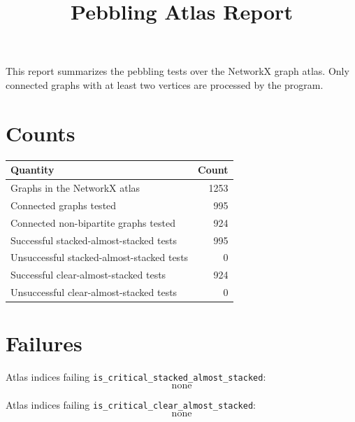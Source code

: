 \documentclass{amsart}
\title{Pebbling Atlas Report}
\author{}
\date{}
\begin{document}
\maketitle

This report summarizes the pebbling tests over the NetworkX graph atlas.
Only connected graphs with at least two vertices are processed by the program.

\section*{Counts}

\begin{center}
\begin{tabular}{lr}
\toprule
Quantity & Count \\
\midrule
Graphs in the NetworkX atlas & 1253 \\
Connected graphs tested & 995 \\
Connected non-bipartite graphs tested & 924 \\
Successful stacked-almost-stacked tests & 995 \\
Unsuccessful stacked-almost-stacked tests & 0 \\
Successful clear-almost-stacked tests & 924 \\
Unsuccessful clear-almost-stacked tests & 0 \\
\bottomrule
\end{tabular}
\end{center}

\section*{Failures}

Atlas indices failing \texttt{is\_critical\_stacked\_almost\_stacked}:
\[
\text{none}
\]

Atlas indices failing \texttt{is\_critical\_clear\_almost\_stacked}:
\[
\text{none}
\]
\end{document}
